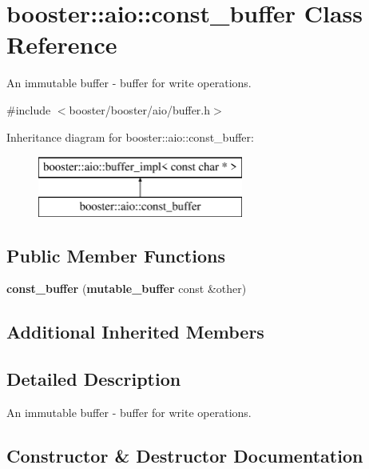 \section{booster\-:\-:aio\-:\-:const\-\_\-buffer Class Reference}
\label{classbooster_1_1aio_1_1const__buffer}


An immutable buffer -\/ buffer for write operations.  




{\ttfamily \#include $<$booster/booster/aio/buffer.\-h$>$}

Inheritance diagram for booster\-:\-:aio\-:\-:const\-\_\-buffer\-:\begin{figure}[H]
\begin{center}
\leavevmode
\includegraphics[height=2.000000cm]{classbooster_1_1aio_1_1const__buffer}
\end{center}
\end{figure}
\subsection*{Public Member Functions}
\begin{DoxyCompactItemize}
\item 
{\bf const\-\_\-buffer} ({\bf mutable\-\_\-buffer} const \&other)
\end{DoxyCompactItemize}
\subsection*{Additional Inherited Members}


\subsection{Detailed Description}
An immutable buffer -\/ buffer for write operations. 

\subsection{Constructor \& Destructor Documentation}
